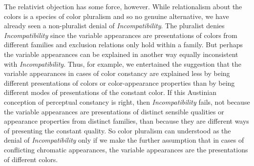 \documentclass[12pt]{article}
\begin{document}
The relativist objection has some force, however. While relationalism about the colors is a species of color pluralism and so no genuine alternative, we have already seen a non-pluralist denial of \emph{Incompatibility}. The pluralist denies \emph{Incompatibility} since the variable appearances are presentations of colors from different families and exclusion relations only hold within a family. But perhaps the variable appearances can be explained in another way equally inconsistent with \emph{Incompatibility}. Thus, for example, we entertained the suggestion that the variable appearances in cases of color constancy are explained less by being different presentations of colors or color-appearance properties than by being different modes of presentations of the constant color. If this Austinian conception of perceptual constancy is right, then \emph{Incompatibility} fails, not because the variable appearances are presentations of distinct sensible qualities or appearance properties from distinct families, than because they are different ways of presenting the constant quality. So color pluralism can understood as the denial of \emph{Incompatibility} only if we make the further assumption that in cases of conflicting chromatic appearances, the variable appearances are the presentations of different colors. 
\end{document}
